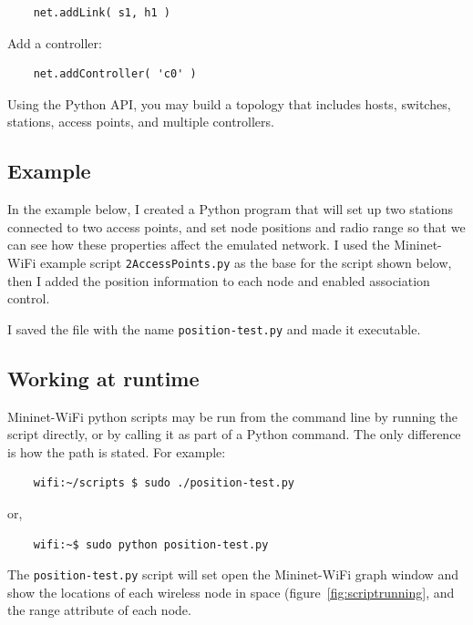 \begin{verbatim}
    net.addLink( s1, h1 )
\end{verbatim}
    
\noindent Add a controller:

\begin{verbatim}
    net.addController( 'c0' )
\end{verbatim}
        
\noindent Using the Python API, you may build a topology that includes hosts, switches, stations, access points, and multiple controllers.

\subsection{ Example }

In the example below, I created a Python program that will set up two stations connected to two access points, and set node positions and radio range so that we can see how these properties affect the emulated network. I used the Mininet-WiFi example script \texttt{2AccessPoints.py} as the base for the script shown below, then I added the position information to each node and enabled association control.



I saved the file with the name \texttt{position-test.py} and made it executable. 

\subsection{Working at runtime}

Mininet-WiFi python scripts may be run from the command line by running the script directly, or by calling it as part of a Python command. The only difference is how the path is stated. For example:

\begin{verbatim}
    wifi:~/scripts $ sudo ./position-test.py
\end{verbatim}
or,
\begin{verbatim}
    wifi:~$ sudo python position-test.py
\end{verbatim}

The \texttt{position-test.py} script will set open the Mininet-WiFi graph window and show the locations of each wireless node in space (figure~\ref{fig:scriptrunning}, and the range attribute of each node.

